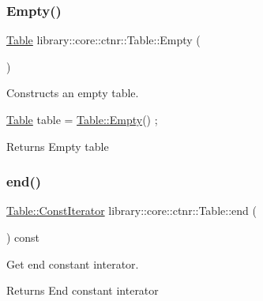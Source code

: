 \subsubsection{\texorpdfstring{Empty()}{Empty()}}
{\footnotesize\ttfamily \hyperlink{classlibrary_1_1core_1_1ctnr_1_1_table}{Table} library\+::core\+::ctnr\+::\+Table\+::\+Empty (\begin{DoxyParamCaption}{ }\end{DoxyParamCaption})\hspace{0.3cm}{\ttfamily [static]}}



Constructs an empty table. 


\begin{DoxyCode}
\hyperlink{classlibrary_1_1core_1_1ctnr_1_1_table_a5b11121caa4288c3da642af7c6a5a632}{Table} table = \hyperlink{classlibrary_1_1core_1_1ctnr_1_1_table_ada8d9997351d5aea25ae8e563eedeb1c}{Table::Empty}() ;
\end{DoxyCode}


\begin{DoxyReturn}{Returns}
Empty table 
\end{DoxyReturn}
\mbox{\label{classlibrary_1_1core_1_1ctnr_1_1_table_af1aadfb47df33ffa4f611f571d52bd89}} 
\subsubsection{\texorpdfstring{end()}{end()}}
{\footnotesize\ttfamily \hyperlink{classlibrary_1_1core_1_1ctnr_1_1_table_a7fa78ad4e7e8d27ceab0bff51ab84fc3}{Table\+::\+Const\+Iterator} library\+::core\+::ctnr\+::\+Table\+::end (\begin{DoxyParamCaption}{ }\end{DoxyParamCaption}) const}



Get end constant interator. 

\begin{DoxyReturn}{Returns}
End constant interator 
\end{DoxyReturn}
\mbox{\label{classlibrary_1_1core_1_1ctnr_1_1_table_af725ea46d4737e1c3d0d8ad5a4dda733}} 

